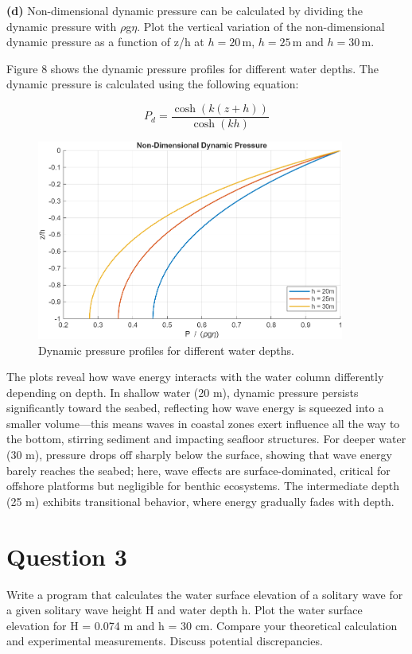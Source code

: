 \documentclass[a4paper]{article}
\begin{document}
\noindent\textbf{(d)} Non-dimensional dynamic pressure can be calculated by dividing the dynamic pressure with $\rho$g$\eta$. Plot the vertical variation of the non-dimensional dynamic pressure as a function of z/h at \( h = 20 \, \text{m} \), \( h = 25 \, \text{m} \) and \( h = 30 \, \text{m} \).
\vspace{0.3cm}

Figure 8 shows the dynamic pressure profiles for different water depths. The dynamic pressure is calculated using the following equation:

\[
P_d = \frac{\cosh(k(z+h))}{\cosh(kh)}
\]

\begin{figure}[H]
    \centering
    \includegraphics[width=0.9\textwidth]{CE591HW1-Q1d.png}
    \caption{\small Dynamic pressure profiles for different water depths.}
    \label{fig:plot2d}
\end{figure} 

The plots reveal how wave energy interacts with the water column differently depending on depth. In shallow water (20 m), dynamic pressure persists significantly toward the seabed, reflecting how wave energy is squeezed into a smaller volume—this means waves in coastal zones exert influence all the way to the bottom, stirring sediment and impacting seafloor structures. For deeper water (30 m), pressure drops off sharply below the surface, showing that wave energy barely reaches the seabed; here, wave effects are surface-dominated, critical for offshore platforms but negligible for benthic ecosystems. The intermediate depth (25 m) exhibits transitional behavior, where energy gradually fades with depth.

\section{Question 3} Write a program that calculates the water surface elevation of a solitary wave for a given solitary wave height H and water depth h. Plot the water surface elevation for H = 0.074 m and h = 30 cm. Compare your theoretical calculation and experimental measurements. Discuss potential discrepancies.
\vspace{0.3cm}
\end{document}
